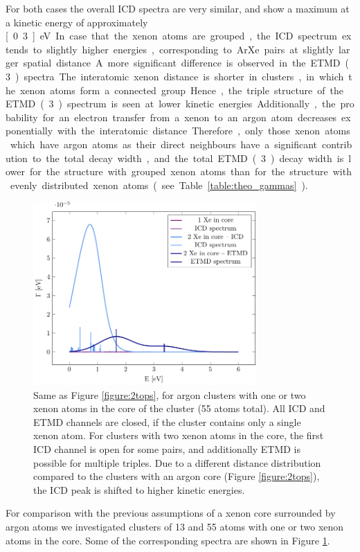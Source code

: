 For both cases the overall ICD spectra are very similar, and show a maximum at a kinetic energy of approximately \unit[0.3]{eV}. 
In case that the xenon atoms are grouped, the ICD spectrum extends to slightly higher energies, corresponding to ArXe pairs at slightly larger spatial distance.
A more significant difference is observed in the ETMD(3) spectra. 
The interatomic xenon distance is shorter in clusters, in which the xenon atoms form a connected group.
Hence, the triple structure of the ETMD(3) spectrum is seen at lower kinetic energies. 
Additionally, the probability for an electron
transfer from a xenon to an argon atom decreases exponentially with the
interatomic distance. Therefore, only those xenon atoms which have argon
atoms as their direct neighbours have a significant contribution to the
total decay width, and the total ETMD(3) decay width is lower for the structure with
grouped xenon atoms than for
the structure with evenly distributed xenon atoms (see Table \ref{table:theo_gammas}).

\begin{figure}[ht]
 \centering
 \includegraphics[width=8.5cm]{pics/xe_3_in.pdf}
 \caption{Same as Figure \protect\ref{figure:2tops}, for argon clusters with
          one or two xenon atoms in the core of the cluster (55 atoms total). 
          All ICD and ETMD channels are closed, if the cluster contains only 
          a single xenon atom. For clusters with two xenon atoms
          in the core, the first ICD channel is open for some pairs,
          and additionally ETMD is possible for multiple triples. Due to a
          different distance distribution compared to the clusters with an argon
          core (Figure \protect\ref{figure:2tops}), 
          the ICD peak is shifted to higher kinetic energies.}
 \label{figure:xe_3_in}
\end{figure}
%
For comparison with the previous assumptions of a xenon core surrounded
by argon atoms we investigated clusters of 13 and 55 atoms with one or two
xenon atoms in the core. Some of the corresponding
spectra are shown in Figure \ref{figure:xe_3_in}.

